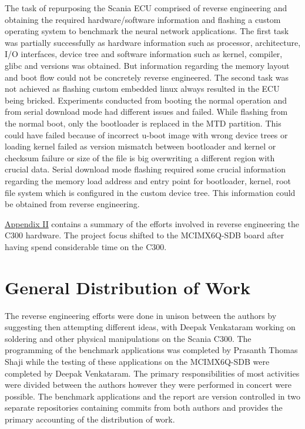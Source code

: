 The task of repurposing the Scania ECU comprised of reverse engineering and obtaining the required hardware/software information and flashing a custom operating system to benchmark the neural network applications. The first task was partially successfully as hardware information such as processor, architecture, I/O interfaces, device tree and software information such as kernel, compiler, glibc and versions was obtained. But information regarding the memory layout and boot flow could not be concretely reverse engineered. The second task was not achieved as flashing custom embedded linux always resulted in the ECU being bricked. Experiments conducted from booting the normal operation and from serial download mode had different issues and failed. While flashing from the normal boot, only the bootloader is replaced in the MTD partition. This could have failed because of incorrect u-boot image with wrong device trees or loading kernel failed as version mismatch between bootloader and kernel or checksum failure or size of the file is big overwriting a different region with crucial data. Serial download mode flashing required some crucial information regarding the memory load address and entry point for bootloader, kernel, root file system which is configured in the custom device tree. This information could be obtained from reverse engineering.

\hyperref[rtc-c300]{Appendix II} contains a summary of the efforts involved in reverse engineering the C300 hardware. The project focus shifted to the MCIMX6Q-SDB board after having spend considerable time on the C300.

\section{General Distribution of Work}

The reverse engineering efforts were done in unison between the authors by suggesting then attempting different ideas, with Deepak Venkataram working on soldering and other physical manipulations on the Scania C300. The programming of the benchmark applications was completed by Prasanth Thomas Shaji while the testing of these applications on the MCIMX6Q-SDB were completed by Deepak Venkataram. The primary responsibilities of most activities were divided between the authors however they were performed in concert were possible. The benchmark applications and the report are version controlled in two separate repositories containing commits from both authors and provides the primary accounting of the distribution of work.

